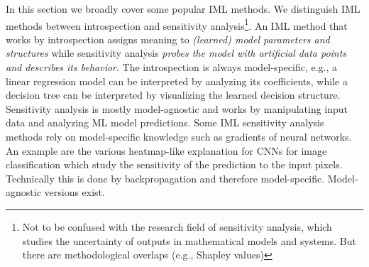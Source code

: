 \documentclass[runningheads]{llncs}
\begin{document}
In this section we broadly cover some popular IML methods.
We distinguish IML methods between introspection and sensitivity analysis\footnote{Not to be confused with the research field of sensitivity analysis, which studies the uncertainty of outputs in mathematical models and systems. But there are methodological overlaps (e.g., Shapley values)}.
An IML method that works by introspection assigns meaning to \textit{(learned) model parameters and structures} while sensitivity analysis \textit{probes the model with artificial data points and describes its behavior}.
The introspection is always model-specific, e.g., a linear regression model can be interpreted by analyzing its coefficients, while a decision tree can be interpreted by visualizing the learned decision structure.
Sensitivity analysis is mostly model-agnostic and works by manipulating input data and analyzing ML model  predictions.
Some IML sensitivity analysis methods rely on model-specific knowledge such as gradients of neural networks. An example are the various heatmap-like explanation for CNNs for image classification \cite{sundararajan2017axiomatic,lundberg2017unified,montavon2017explaining,simonyan2013deep,shrikumar2016not} which study the sensitivity of the prediction to the input pixels. Technically this is done by backpropagation and therefore model-specific. Model-agnostic versions \cite{ribeiro2016should,lundberg2017unified,zeiler2014visualizing} exist.


\end{document}
